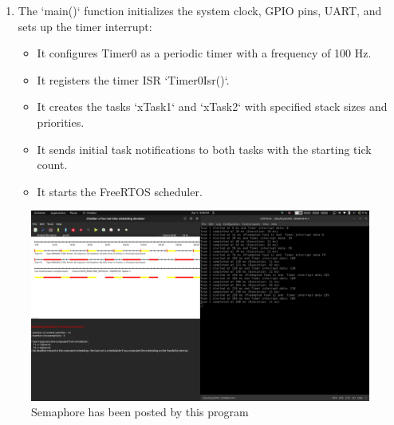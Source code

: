 \documentclass[a4paper,11pt]{article}%
\newenvironment{qanda}{\setlength{\parindent}{0pt}}{\bigskip}
\begin{document}
\begin{qanda}
\begin{enumerate}
\begin{itemize}
	\end{itemize}
	\item The `main()` function initializes the system clock, GPIO pins, UART, and sets up the timer interrupt:
	\begin{itemize}
		\item It configures Timer0 as a periodic timer with a frequency of 100 Hz.
		\item It registers the timer ISR `Timer0Isr()`.
		\item It creates the tasks `xTask1` and `xTask2` with specified stack sizes and priorities.
		\item It sends initial task notifications to both tasks with the starting tick count.
		\item It starts the FreeRTOS scheduler.
	\end{itemize}
\end{enumerate}




\begin{figure}[!h]
	\centering
	\includegraphics[scale=0.28]{figures/q3.png}
	\caption{Semaphore has been posted by this program}


\end{figure}
\end{qanda}
\end{document}
